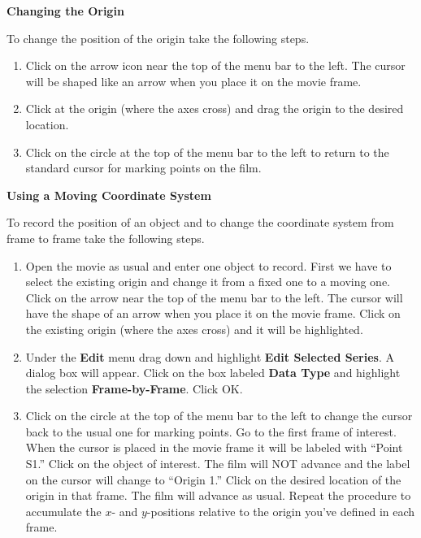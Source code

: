 \textbf{Changing the Origin} 

To change the position of the origin take the following steps.

\begin{enumerate}
\item Click on the arrow icon near the top of the menu bar to the left.
The cursor will be shaped like an arrow when you place it on the movie
frame. 
\item Click at the origin (where the axes cross) and drag the origin to
the desired location. 
\item Click on the circle at the top of the menu bar to the left to return
to the standard cursor for marking points on the film. 
\end{enumerate}
\textbf{Using a Moving Coordinate System} 

To record the position of an object and to change the coordinate system
from frame to frame take the following steps.

\begin{enumerate}
\item Open the movie as usual and enter one object to record. First we have
to select the existing origin and change it from a fixed one to a
moving one. Click on the arrow near the top of the menu bar to the
left. The cursor will have the shape of an arrow when you place it
on the movie frame. Click on the existing origin (where the axes cross)
and it will be highlighted.
\item Under the \textbf{Edit} menu drag down and highlight \textbf{Edit
Selected Series}. A dialog box will appear. Click on the box labeled
\textbf{Data Type} and highlight the selection \textbf{Frame-by-Frame}.
Click OK.
\item Click on the circle at the top of the menu bar to the left to change
the cursor back to the usual one for marking points. Go to the first
frame of interest. When the cursor is placed in the movie frame it
will be labeled with ``Point S1.'' Click on the object of interest.
The film will NOT advance and the label on the cursor will change
to ``Origin 1.'' Click on the desired location of the origin
in that frame. The film will advance as usual. Repeat the procedure
to accumulate the $x$- and $y$-positions relative to the origin you've
defined in each frame.\end{enumerate}

